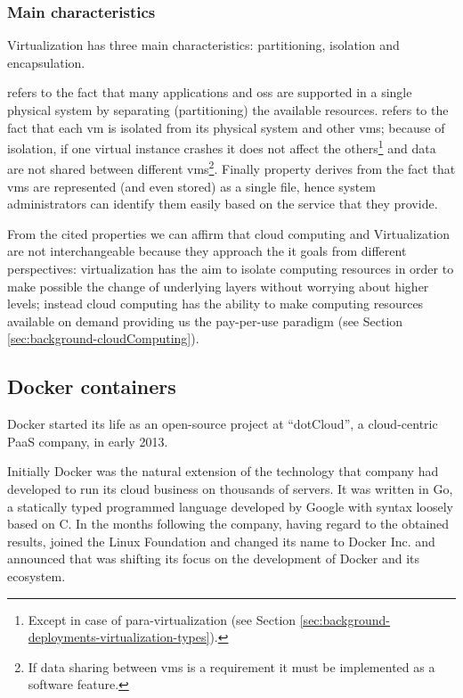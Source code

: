 \subsubsection{Main characteristics}
\label{sec:background-deployments-virtualization-characteristics}
Virtualization has three main characteristics: partitioning, isolation and encapsulation.

 refers to the fact that many applications and \acs{os}s are supported in a single 
physical system by separating (partitioning) the available resources.  refers to the
fact that each \ac{vm} is isolated from its physical system and other \ac{vm}s; because of isolation, if
one virtual instance crashes it does not affect the others\footnote{Except in case of para-virtualization
(see Section \ref{sec:background-deployments-virtualization-types}).} and data are not shared between
different \ac{vm}s\footnote{If data sharing between \ac{vm}s is a requirement it must be implemented as
a software feature.}. Finally  property derives from the fact that \ac{vm}s are
represented (and even stored) as a single file, hence system administrators can identify them easily
based on the service that they provide.

From the cited properties we can affirm that cloud computing and Virtualization are not interchangeable
because they approach the \acs{it} goals from different perspectives: virtualization has the aim to
isolate computing resources in order to make possible the change of underlying layers without worrying
about higher levels; instead cloud computing has the ability to make computing resources available on
demand providing us the pay-per-use paradigm (see Section \ref{sec:background-cloudComputing}).

\subsection{Docker containers}
\label{sec:background-deployments-docker}
Docker started its life as an open-source project at “dotCloud”, a cloud-centric PaaS company, in early
2013.

Initially Docker was the natural extension of the technology that company had developed to run its cloud
business on thousands of servers. It was written in Go, a statically typed programmed language developed
by Google with syntax loosely based on C. In the months following the company, having regard to the obtained
results, joined the Linux Foundation and changed its name to Docker Inc. and announced that was shifting
its focus on the development of Docker and its ecosystem.

